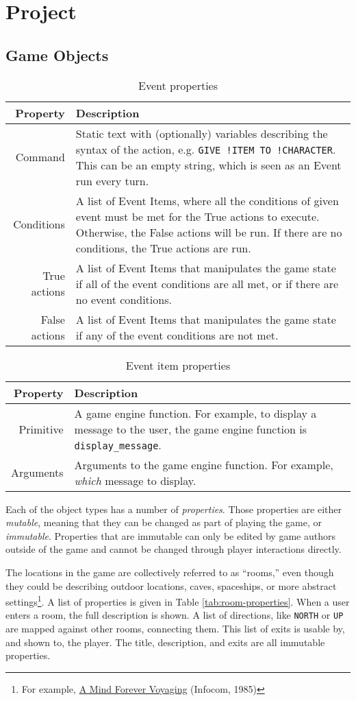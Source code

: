 \documentclass{article}
\newcommand{\enterProblemHeader}[1]{
}
\newcommand{\exitProblemHeader}[1]{
\nobreak\extramarks{#1}{}\nobreak
}
\newcounter{homeworkProblemCounter} %
\newcommand{\homeworkProblemName}{}
\newenvironment{homeworkProblem}[1][Problem \arabic{homeworkProblemCounter}]{ %
\stepcounter{homeworkProblemCounter} %
\renewcommand{\homeworkProblemName}{#1} %
\section{\homeworkProblemName} %
\enterProblemHeader{\homeworkProblemName} %
}{
\exitProblemHeader{\homeworkProblemName} %
}
\newcommand{\homeworkSectionName}{}
\newenvironment{homeworkSection}[1]{ %
\renewcommand{\homeworkSectionName}{#1} %
\subsection{\homeworkSectionName} %
\enterProblemHeader{\homeworkProblemName\ [\homeworkSectionName]} %
}{
\enterProblemHeader{\homeworkProblemName} %
}
\begin{document}
\begin{homeworkProblem}[Project]
\begin{homeworkSection}{Game Objects}
\begin{table}
	\begin{tabularx}{\textwidth}{|r|X|}
		\hline
		Property & Description \\
		\hline \hline
		Command & Static text with (optionally) variables describing the syntax of the action, e.g. \texttt{GIVE !ITEM TO !CHARACTER}. This can be an empty string, which is seen as an Event run every turn. \\
		Conditions & A list of Event Items, where all the conditions of given event must be met for the True actions to execute. Otherwise, the False actions will be run. If there are no conditions, the True actions are run. \\
		True actions & A list of Event Items that manipulates the game state if all of the event conditions are all met, or if there are no event conditions. \\
		False actions & A list of Event Items that manipulates the game state if any of the event conditions are not met. \\
		\hline
	\end{tabularx}
	\caption{Event properties}
	\label{tab:event-properties}
\end{table}

\begin{table}
	\begin{tabularx}{\textwidth}{|r|X|}
		\hline
		Property & Description \\
		\hline \hline
		Primitive & A game engine function. For example, to display a message to the user, the game engine function is \texttt{display\_message}. \\
		Arguments & Arguments to the game engine function. For example, \textit{which} message to display. \\
		\hline
	\end{tabularx}
	\caption{Event item properties}
	\label{tab:event-item-properties}
\end{table}

	Each of the object types has a number of \textit{properties}. Those properties are either \textit{mutable}, meaning that they can be changed as part of playing the game, or \textit{immutable}. Properties that are immutable can only be edited by game authors outside of the game and cannot be changed through player interactions directly.

	The locations in the game are collectively referred to as ``rooms,'' even though they could be describing outdoor locations, caves, spaceships, or more abstract settings\footnote{For example, \href{https://en.wikipedia.org/wiki/A_Mind_Forever_Voyaging}{A Mind Forever Voyaging} (Infocom, 1985)}. A list of properties is given in Table \ref{tab:room-properties}. When a user enters a room, the full description is shown. A list of directions, like \texttt{NORTH} or \texttt{UP} are mapped against other rooms, connecting them. This list of exits is usable by, and shown to, the player. The title, description, and exits are all immutable properties.


\end{homeworkSection}
\end{homeworkProblem}
\end{document}

